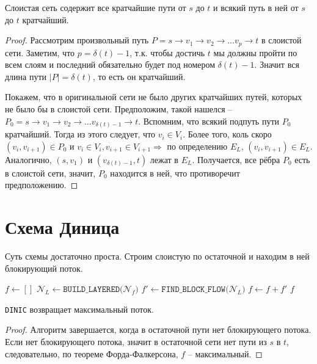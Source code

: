 \St Слоистая сеть содержит все кратчайшие пути от $s$ до $t$ и всякий путь в ней от $s$ до $t$ кратчайший.
\begin{proof}
    
    Рассмотрим произвольный путь $P = s \to v_1 \to v_2 \to \dots v_p \to t$ в слоистой сети. Заметим, что $p = \delta(t) - 1$, т.к. чтобы достичь $t$ мы должны пройти по всем слоям и последний обязательно будет под номером $\delta(t) - 1$.
    Значит вся длина пути $|P| = \delta(t)$, то есть он кратчайший.

    Покажем, что в оригинальной сети не было других кратчайших путей, которых не было бы в слоистой сети. Предположим, такой нашелся -- $P_0 = s \to v_1 \to v_2 \to \dots v_{\delta(t) - 1} \to t$.
    Вспомним, что всякий подпуть пути $P_0$ кратчайший. Тогда из этого следует, что $v_i \in V_i$.
    Более того, коль скоро $(v_i, v_{i + 1}) \in P_0$ и $v_i \in V_i, v_{i + 1} \in V_{i + 1} \Rightarrow$ по определению $E_L$, $(v_{i}, v_{i + 1}) \in E_L$. Аналогично, $(s, v_1)$ и $(v_{\delta(t) - 1}, t)$ лежат в $E_L$.
    Получается, все рёбра $P_0$ есть в слоистой сети, значит, $P_0$ находится в ней, что противоречит предположению.

\end{proof}

\section{Схема Диница}

Суть схемы достаточно проста. Строим слоистую по остаточной и находим в ней блокирующий поток.

\begin{algorithm}[H]
\caption{Схема Диница}
\begin{algorithmic}[1]

    \State $f \gets []$
        \State $\mathcal{N}_L \gets \texttt{BUILD\_LAYERED(}\mathcal{N}_f\texttt{)}$
        \State $f' \gets \texttt{FIND\_BLOCK\_FLOW(}\mathcal{N}_L\texttt{)}$
        \State $f \gets f + f'$
    \EndWhile
    \State \Return $f$
\EndFunction
\end{algorithmic}
\end{algorithm}

\St \texttt{DINIC} возвращает максимальный поток.
\begin{proof}

    Алгоритм завершается, когда в остаточной пути нет блокирующего потока. Если нет блокирующего потока, значит в остаточной сети нет пути из $s$ в $t$, следовательно, по теореме Форда-Фалкерсона, $f$ -- максимальный.

\end{proof}

